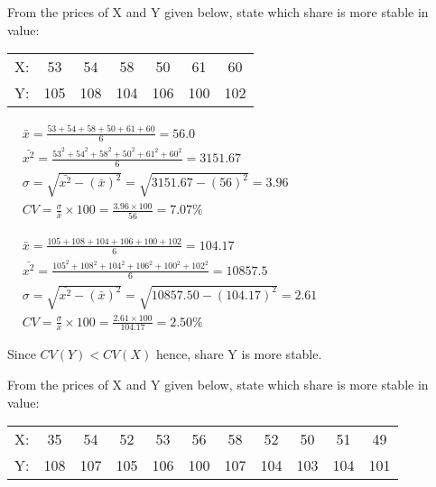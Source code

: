 \documentclass[12pt]{article}
\begin{document}
\vspace{5ex}
\textbf{} From the prices of X and Y given below, state which share is more stable in value:
\vspace{-0.25\baselineskip}
\begin{center}
   \begin{tabularx}{0.8\linewidth}{lC|C|C|C|C|C|}
      X: & 53 & 54 & 58 & 50 & 61 & 60\\
      Y: & 105 & 108 & 104 & 106 & 100 & 102
   \end{tabularx}
\end{center}

\vspace{1ex}
\begin{minipage}[t]{0.463\linewidth}
   \noindent
   \vspace{1ex}
   $\begin{aligned}
      &\bar{x} = \frac{53+54+58+50+61+60}{6} = 56.0\\[1ex]
      &\bar{x^2} = \frac{53^2+54^2+58^2+50^2+61^2+60^2}{6} = 3151.67\\[1ex]
      &\sigma = \sqrt{\bar{x^2} - (\bar{x})^2} = \sqrt{3151.67 - (56)^2} = 3.96\\[1ex]
      &CV = \frac{\sigma}{\bar{x}}\times 100 = \frac{3.96 \times 100}{56} = 7.07\%
   \end{aligned}$

\end{minipage}\vrule\hspace{0.8ex}
\begin{minipage}[t]{0.52\linewidth}
   \noindent
   \vspace{1ex}
   $\begin{aligned}
      &\bar{x} = \frac{105+108+104+106+100+102}{6} = 104.17\\[1ex]
      &\bar{x^2} = \frac{105^2+108^2+104^2+106^2+100^2+102^2}{6} = 10857.5\\[1ex]
      &\sigma = \sqrt{\bar{x^2} - (\bar{x})^2} = \sqrt{10857.50 - (104.17)^2} = 2.61\\[1ex]
      &CV = \frac{\sigma}{\bar{x}}\times 100 = \frac{2.61 \times 100}{104.17} = 2.50\%
   \end{aligned}$
\end{minipage}


\vspace{2ex}
Since $CV(Y) < CV(X)$ hence, share Y is more stable.

\vspace{5ex}
\textbf{} From the prices of X and Y given below, state which share is more stable in value:
\vspace{-0.25\baselineskip}
\begin{center}
   \begin{tabularx}{0.8\linewidth}{lC|C|C|C|C|C|C|C|C|C|}
      X: & 35 & 54 & 52 & 53 & 56 & 58 & 52 & 50 & 51 & 49\\
      Y: & 108 & 107 & 105 & 106 & 100 & 107 & 104 & 103 & 104 & 101
   \end{tabularx}
\end{center}
\end{document}
